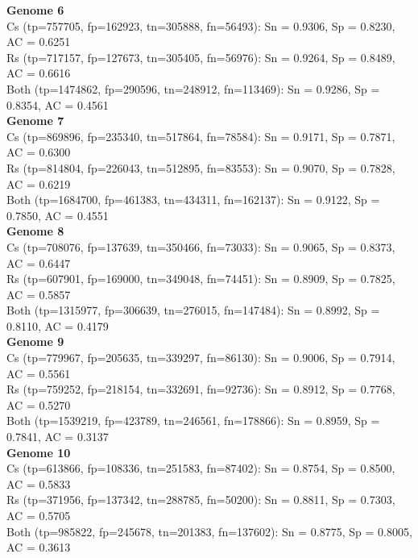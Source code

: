 \documentclass[paper=a4, fontsize=11pt]{scrartcl} %
\numberwithin{equation}{section} %
\numberwithin{figure}{section} %
\numberwithin{table}{section} %
\begin{document}
\textbf{Genome 6} \\
Cs   (tp=757705, fp=162923, tn=305888, fn=56493): Sn = 0.9306, Sp = 0.8230, AC = 0.6251 \\
Rs   (tp=717157, fp=127673, tn=305405, fn=56976): Sn = 0.9264, Sp = 0.8489, AC = 0.6616 \\
Both (tp=1474862, fp=290596, tn=248912, fn=113469): Sn = 0.9286, Sp = 0.8354, AC = 0.4561 \\

\textbf{Genome 7} \\
Cs   (tp=869896, fp=235340, tn=517864, fn=78584): Sn = 0.9171, Sp = 0.7871, AC = 0.6300 \\
Rs   (tp=814804, fp=226043, tn=512895, fn=83553): Sn = 0.9070, Sp = 0.7828, AC = 0.6219 \\
Both (tp=1684700, fp=461383, tn=434311, fn=162137): Sn = 0.9122, Sp = 0.7850, AC = 0.4551 \\

\textbf{Genome 8} \\
Cs   (tp=708076, fp=137639, tn=350466, fn=73033): Sn = 0.9065, Sp = 0.8373, AC = 0.6447 \\
Rs   (tp=607901, fp=169000, tn=349048, fn=74451): Sn = 0.8909, Sp = 0.7825, AC = 0.5857 \\
Both (tp=1315977, fp=306639, tn=276015, fn=147484): Sn = 0.8992, Sp = 0.8110, AC = 0.4179 \\

\textbf{Genome 9}\\
Cs   (tp=779967, fp=205635, tn=339297, fn=86130): Sn = 0.9006, Sp = 0.7914, AC = 0.5561 \\
Rs   (tp=759252, fp=218154, tn=332691, fn=92736): Sn = 0.8912, Sp = 0.7768, AC = 0.5270 \\
Both (tp=1539219, fp=423789, tn=246561, fn=178866): Sn = 0.8959, Sp = 0.7841, AC = 0.3137 \\

\textbf{Genome 10} \\
Cs   (tp=613866, fp=108336, tn=251583, fn=87402): Sn = 0.8754, Sp = 0.8500, AC = 0.5833 \\
Rs   (tp=371956, fp=137342, tn=288785, fn=50200): Sn = 0.8811, Sp = 0.7303, AC = 0.5705 \\
Both (tp=985822, fp=245678, tn=201383, fn=137602): Sn = 0.8775, Sp = 0.8005, AC = 0.3613 \\

\end{document}
